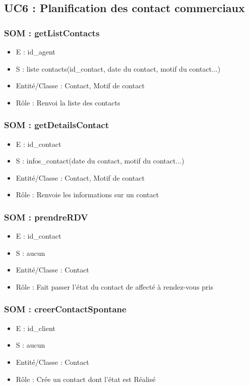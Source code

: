 \subsection{UC6 : Planification des contact commerciaux}
\subsubsection{SOM : getListContacts}
	\begin{itemize}
		\item E : id\_agent
		\item S : liste contacts(id\_contact, date du contact, motif du contact...)
		\item Entité/Classe : Contact, Motif de contact
		\item Rôle : Renvoi la liste des contacts
	\end{itemize}

\subsubsection{SOM : getDetailsContact}
	\begin{itemize}
		\item E : id\_contact
		\item S : infos\_contact(date du contact, motif du contact...)
		\item Entité/Classe : Contact, Motif de contact
		\item Rôle : Renvoie les informations sur un contact
	\end{itemize}

\subsubsection{SOM : prendreRDV}
	\begin{itemize}
		\item E : id\_contact
		\item S : aucun
		\item Entité/Classe : Contact
		\item Rôle : Fait passer l’état du contact de affecté à rendez-vous pris
	\end{itemize}

\subsubsection{SOM : creerContactSpontane}
	\begin{itemize}
		\item E : id\_client
		\item S : aucun
		\item Entité/Classe : Contact
		\item Rôle : Crée un contact dont l’état est Réalisé
	\end{itemize}



